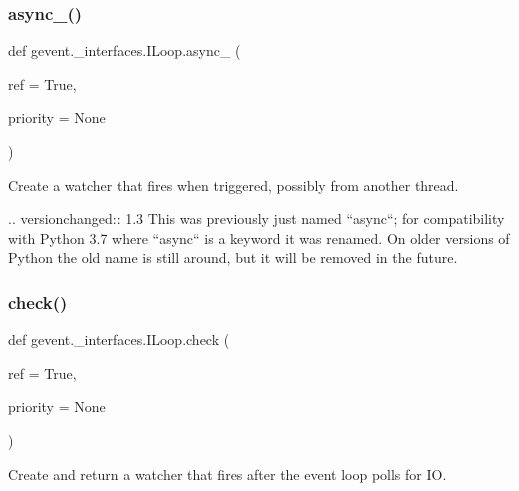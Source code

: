 \subsubsection{\texorpdfstring{async\+\_\+()}{async\_()}}
{\footnotesize\ttfamily def gevent.\+\_\+interfaces.\+I\+Loop.\+async\+\_\+ (\begin{DoxyParamCaption}\item[{}]{ref = {\ttfamily True},  }\item[{}]{priority = {\ttfamily None} }\end{DoxyParamCaption})}

\begin{DoxyVerb}Create a watcher that fires when triggered, possibly
from another thread.

.. versionchanged:: 1.3
   This was previously just named ``async``; for compatibility
   with Python 3.7 where ``async`` is a keyword it was renamed.
   On older versions of Python the old name is still around, but
   it will be removed in the future.
\end{DoxyVerb}
 \mbox{\label{classgevent_1_1__interfaces_1_1_i_loop_ae02c602ae5216043beeae4696295fb40}} 
\subsubsection{\texorpdfstring{check()}{check()}}
{\footnotesize\ttfamily def gevent.\+\_\+interfaces.\+I\+Loop.\+check (\begin{DoxyParamCaption}\item[{}]{ref = {\ttfamily True},  }\item[{}]{priority = {\ttfamily None} }\end{DoxyParamCaption})}

\begin{DoxyVerb}Create and return a watcher that fires after the event loop
polls for IO.
\end{DoxyVerb}
 \mbox{\label{classgevent_1_1__interfaces_1_1_i_loop_ac64946c90ea5c9eaebab62293013705a}} 

